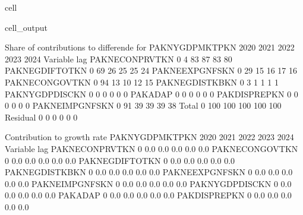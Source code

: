 \documentclass[letterpaper,10pt,english]{jupyterBook}
\begin{document}
\begin{sphinxuseclass}{cell}
\begin{sphinxVerbatimOutput}
\begin{sphinxuseclass}{cell_output}
\begin{sphinxVerbatim}[commandchars=\\\{\}]
 Share of contributions to differende for  PAKNYGDPMKTPKN
                          2020        2021        2022        2023        2024
Variable       lag                                                            
PAKNECONPRVTKN 0           \PYGZhy{}4\PYGZpc{}         83\PYGZpc{}         87\PYGZpc{}         83\PYGZpc{}         80\PYGZpc{}
PAKNEGDIFTOTKN 0           69\PYGZpc{}         26\PYGZpc{}         25\PYGZpc{}         25\PYGZpc{}         24\PYGZpc{}
PAKNEEXPGNFSKN 0           29\PYGZpc{}         15\PYGZpc{}         16\PYGZpc{}         17\PYGZpc{}         16\PYGZpc{}
PAKNECONGOVTKN 0           94\PYGZpc{}         13\PYGZpc{}         10\PYGZpc{}         12\PYGZpc{}         15\PYGZpc{}
PAKNEGDISTKBKN 0            3\PYGZpc{}          1\PYGZpc{}          1\PYGZpc{}          1\PYGZpc{}          1\PYGZpc{}
PAKNYGDPDISCKN 0            0\PYGZpc{}          0\PYGZpc{}          0\PYGZpc{}          0\PYGZpc{}          0\PYGZpc{}
PAKADAP        0            0\PYGZpc{}          0\PYGZpc{}          0\PYGZpc{}          0\PYGZpc{}          0\PYGZpc{}
PAKDISPREPKN   0            0\PYGZpc{}          0\PYGZpc{}          0\PYGZpc{}          0\PYGZpc{}          0\PYGZpc{}
PAKNEIMPGNFSKN 0          \PYGZhy{}91\PYGZpc{}        \PYGZhy{}39\PYGZpc{}        \PYGZhy{}39\PYGZpc{}        \PYGZhy{}39\PYGZpc{}        \PYGZhy{}38\PYGZpc{}
Total          0          100\PYGZpc{}        100\PYGZpc{}        100\PYGZpc{}        100\PYGZpc{}        100\PYGZpc{}
Residual       0            0\PYGZpc{}          0\PYGZpc{}          0\PYGZpc{}          0\PYGZpc{}          0\PYGZpc{}

 Contribution to growth rate PAKNYGDPMKTPKN
                          2020        2021        2022        2023        2024
Variable       lag                                                            
PAKNECONPRVTKN 0         \PYGZhy{}0.0\PYGZpc{}        0.0\PYGZpc{}        0.0\PYGZpc{}        0.0\PYGZpc{}        0.0\PYGZpc{}
PAKNECONGOVTKN 0          0.0\PYGZpc{}        0.0\PYGZpc{}        0.0\PYGZpc{}        0.0\PYGZpc{}        0.0\PYGZpc{}
PAKNEGDIFTOTKN 0          0.0\PYGZpc{}        0.0\PYGZpc{}        0.0\PYGZpc{}        0.0\PYGZpc{}        0.0\PYGZpc{}
PAKNEGDISTKBKN 0          0.0\PYGZpc{}        0.0\PYGZpc{}        0.0\PYGZpc{}        0.0\PYGZpc{}        0.0\PYGZpc{}
PAKNEEXPGNFSKN 0          0.0\PYGZpc{}        0.0\PYGZpc{}        0.0\PYGZpc{}        0.0\PYGZpc{}        0.0\PYGZpc{}
PAKNEIMPGNFSKN 0         \PYGZhy{}0.0\PYGZpc{}       \PYGZhy{}0.0\PYGZpc{}       \PYGZhy{}0.0\PYGZpc{}       \PYGZhy{}0.0\PYGZpc{}       \PYGZhy{}0.0\PYGZpc{}
PAKNYGDPDISCKN 0          0.0\PYGZpc{}        0.0\PYGZpc{}        0.0\PYGZpc{}        0.0\PYGZpc{}        0.0\PYGZpc{}
PAKADAP        0          0.0\PYGZpc{}        0.0\PYGZpc{}        0.0\PYGZpc{}        0.0\PYGZpc{}        0.0\PYGZpc{}
PAKDISPREPKN   0          0.0\PYGZpc{}        0.0\PYGZpc{}        0.0\PYGZpc{}        0.0\PYGZpc{}        0.0\PYGZpc{}
\end{sphinxVerbatim}


\end{sphinxuseclass}
\end{sphinxVerbatimOutput}
\end{sphinxuseclass}
\end{document}
